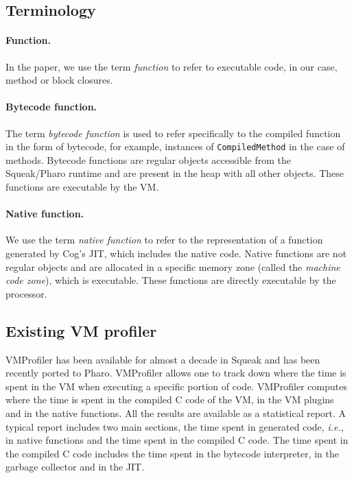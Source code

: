 \documentclass[10pt,preprint,nonatbib]{sigplanconf}
\newcommand{\ct}{\lstinline[backgroundcolor=\color{white},basicstyle=\small\ttfamily]}
\newcommand{\ie}{\emph{i.e.,}\xspace}
\begin{document}
\subsection{Terminology}

\paragraph{Function.} In the paper, we use the term \emph{function} to refer to executable code, in our case, method or block closures.

\paragraph{Bytecode function.} The term \emph{bytecode function} is used to refer specifically to the compiled function in the form of bytecode, for example, instances of \ct{CompiledMethod} in the case of methods. Bytecode functions are regular objects accessible from the Squeak/Pharo runtime and are present in the heap with all other objects. These functions are executable by the VM.

\paragraph{Native function.} We use the term \emph{native function} to refer to the representation of a function generated by Cog's JIT, which includes the native code. Native functions are not regular objects and are allocated in a specific memory zone (called the \emph{machine code zone}), which is executable. These functions are directly executable by the processor.

\subsection{Existing VM profiler}

VMProfiler has been available for almost a decade in Squeak and has been recently ported to Pharo. VMProfiler allows one to track down where the time is spent in the VM when executing a specific portion of code. VMProfiler computes where the time is spent in the compiled C code of the VM, in the VM plugins and in the native functions. All the results are available as a statistical report. A typical report includes two main sections, the time spent in generated code, \ie in native functions and the time spent in the compiled C code. The time spent in the compiled C code includes the time spent in the bytecode interpreter, in the garbage collector and in the JIT. 
 
\end{document}
